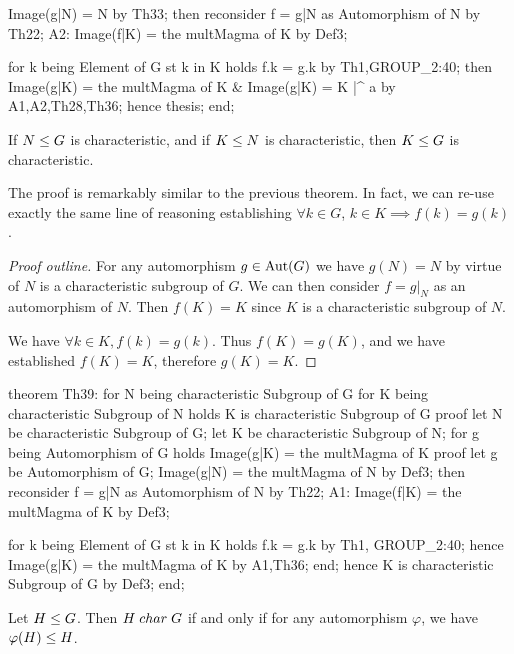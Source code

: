   Image(g|N) = N by Th33;
  then reconsider f = g|N as Automorphism of N by Th22;
  A2: Image(f|K) = the multMagma of K by Def3;

  for k being Element of G st k in K holds f.k = g.k by Th1,GROUP_2:40;
  then Image(g|K) = the multMagma of K & Image(g|K) = K |^ a
  by A1,A2,Th28,Th36;
  hence thesis;
end;
\nwendcode{}\nwdocspar



\begin{theorem}
If $N\leq G$ is characteristic, and if $K\leq N$ is
characteristic, then $K\leq G$ is characteristic.
\end{theorem}

The proof is remarkably similar to the previous theorem. In fact, we can
re-use exactly the same line of reasoning establishing
$\forall k\in G$, $k\in K\implies f(k)=g(k)$.

\begin{proof}[Proof outline]
For any automorphism $g\in\operatorname{Aut}(G)$ we have $g(N)=N$ by virtue of $N$ is
a characteristic subgroup of $G$. We can then consider $f=g|_{N}$ as an
automorphism of $N$. Then $f(K)=K$ since $K$ is a characteristic
subgroup of $N$.

We have $\forall k\in K, f(k)=g(k)$. Thus $f(K)=g(K)$, and we have
established $f(K)=K$, therefore $g(K)=K$.
\end{proof}

\nwenddocs{}\endmoddef\nwstartdeflinemarkup{}\nwenddeflinemarkup
theorem Th39:
  for N being characteristic Subgroup of G
  for K being characteristic Subgroup of N
  holds K is characteristic Subgroup of G
proof
  let N be characteristic Subgroup of G;
  let K be characteristic Subgroup of N;
  for g being Automorphism of G holds Image(g|K) = the multMagma of K
  proof
    let g be Automorphism of G;
    Image(g|N) = the multMagma of N by Def3;
    then reconsider f = g|N as Automorphism of N by Th22;
    A1: Image(f|K) = the multMagma of K by Def3;

    for k being Element of G st k in K holds f.k = g.k by Th1, GROUP_2:40;
    hence Image(g|K) = the multMagma of K by A1,Th36;
  end;
  hence K is characteristic Subgroup of G by Def3;
end;
\eatline
{}\nwendcode{}\nwdocspar
\begin{theorem}\label{thm:results:alt-def-of-char-subgroup}
  Let $H\leq G$.
  Then $H\mathrel{char} G$ if and only if for any automorphism $\varphi$, we have
  $\varphi(H)\leq H$.
\end{theorem}

